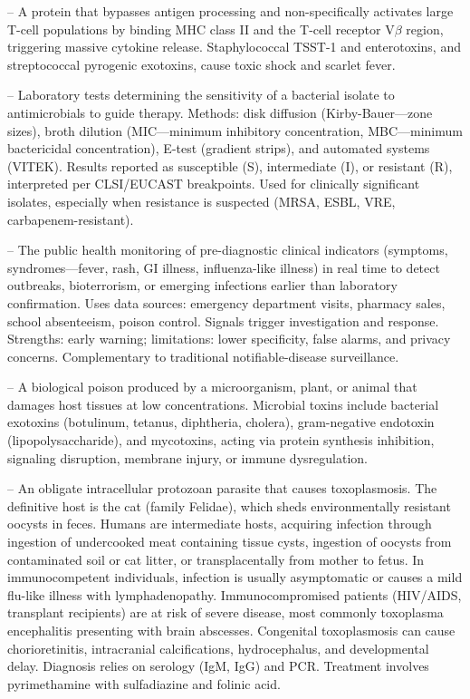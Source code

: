 -- A protein that bypasses antigen processing and non-specifically activates large T-cell populations by binding MHC class II and the T-cell receptor V$\beta$ region, triggering massive cytokine release. Staphylococcal TSST-1 and enterotoxins, and streptococcal pyrogenic exotoxins, cause toxic shock and scarlet fever.

-- Laboratory tests determining the sensitivity of a bacterial isolate to antimicrobials to guide therapy. Methods: disk diffusion (Kirby-Bauer—zone sizes), broth dilution (MIC—minimum inhibitory concentration, MBC—minimum bactericidal concentration), E-test (gradient strips), and automated systems (VITEK). Results reported as susceptible (S), intermediate (I), or resistant (R), interpreted per CLSI/EUCAST breakpoints. Used for clinically significant isolates, especially when resistance is suspected (MRSA, ESBL, VRE, carbapenem-resistant).

-- The public health monitoring of pre-diagnostic clinical indicators (symptoms, syndromes—fever, rash, GI illness, influenza-like illness) in real time to detect outbreaks, bioterrorism, or emerging infections earlier than laboratory confirmation. Uses data sources: emergency department visits, pharmacy sales, school absenteeism, poison control. Signals trigger investigation and response. Strengths: early warning; limitations: lower specificity, false alarms, and privacy concerns. Complementary to traditional notifiable-disease surveillance.

-- A biological poison produced by a microorganism, plant, or animal that damages host tissues at low concentrations. Microbial toxins include bacterial exotoxins (botulinum, tetanus, diphtheria, cholera), gram-negative endotoxin (lipopolysaccharide), and mycotoxins, acting via protein synthesis inhibition, signaling disruption, membrane injury, or immune dysregulation.

-- An obligate intracellular protozoan parasite that causes toxoplasmosis. The definitive host is the cat (family Felidae), which sheds environmentally resistant oocysts in feces. Humans are intermediate hosts, acquiring infection through ingestion of undercooked meat containing tissue cysts, ingestion of oocysts from contaminated soil or cat litter, or transplacentally from mother to fetus. In immunocompetent individuals, infection is usually asymptomatic or causes a mild flu-like illness with lymphadenopathy. Immunocompromised patients (HIV/AIDS, transplant recipients) are at risk of severe disease, most commonly toxoplasma encephalitis presenting with brain abscesses. Congenital toxoplasmosis can cause chorioretinitis, intracranial calcifications, hydrocephalus, and developmental delay. Diagnosis relies on serology (IgM, IgG) and PCR. Treatment involves pyrimethamine with sulfadiazine and folinic acid.

